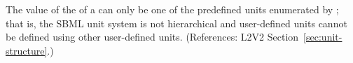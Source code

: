 The value of the   of a \Unit can only be one of
the predefined units enumerated by ; that is,
the SBML unit system is not hierarchical and user-defined units
cannot be defined using other user-defined units.  (References:
L2V2 Section~\ref{sec:unit-structure}.)
